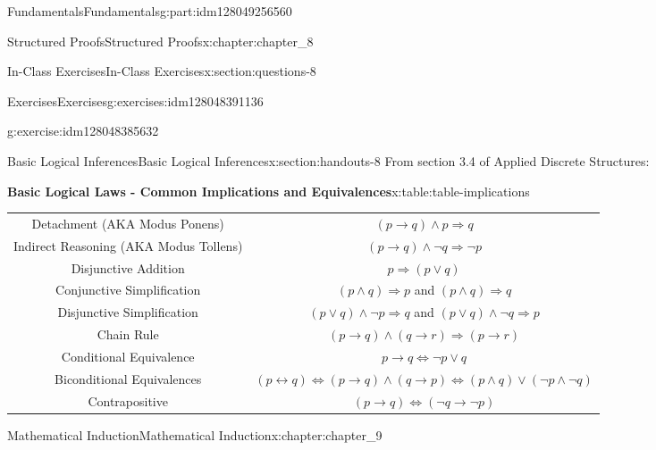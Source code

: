 \documentclass[oneside,10pt,]{book}
\newcommand{\tabularfont}{\relax}
\numberwithin{equation}{section}
\newcommand{\hrulemedium}{\noalign{\hrule height 0.07em}}
\begin{document}
\begin{partptx}{Fundamentals}{}{Fundamentals}{}{}{g:part:idm128049256560}
\begin{chapterptx}{Structured Proofs}{}{Structured Proofs}{}{}{x:chapter:chapter_8}
\begin{sectionptx}{In-Class Exercises}{}{In-Class Exercises}{}{}{x:section:questions-8}
\begin{exercises-subsection}{Exercises}{}{Exercises}{}{}{g:exercises:idm128048391136}
\begin{exercisegroup}
\begin{divisionexerciseeg}{3}{}{}{g:exercise:idm128048385632}
\end{divisionexerciseeg}%
\end{exercisegroup}
\par\medskip\noindent
\end{exercises-subsection}
\end{sectionptx}
%
%
\typeout{************************************************}
\typeout{************************************************}
%
\begin{sectionptx}{Basic Logical Inferences}{}{Basic Logical Inferences}{}{}{x:section:handouts-8}
From section 3.4 of Applied Discrete Structures:%
\begin{tableptx}{\textbf{Basic Logical Laws - Common Implications and Equivalences}}{x:table:table-implications}{}%
\centering
{}%
%
%
%
{\tabularfont%
\begin{tabular}{cc}
Detachment (AKA Modus Ponens)&\((p \rightarrow  q) \land  p\Rightarrow  q\)\tabularnewline\hrulemedium
Indirect Reasoning (AKA Modus Tollens)&\((p \to  q) \land  \neg q \Rightarrow  \neg p\)\tabularnewline\hrulemedium
Disjunctive Addition&\(p\Rightarrow (p\lor q)\)\tabularnewline\hrulemedium
Conjunctive Simplification&\((p \land  q) \Rightarrow  p\) and \((p \land  q) \Rightarrow  q\)\tabularnewline\hrulemedium
Disjunctive Simplification&\((p \lor  q) \land  \neg p \Rightarrow  q\) and \((p \lor q) \land \neg q\Rightarrow p\)\tabularnewline\hrulemedium
Chain Rule&\((p \to  q) \land  ( q \rightarrow  r) \Rightarrow  (p\to  r)\)\tabularnewline\hrulemedium
Conditional Equivalence&\(p \rightarrow  q \Leftrightarrow  \neg p \lor  q\)\tabularnewline\hrulemedium
Biconditional Equivalences&\((p \leftrightarrow  q) \Leftrightarrow  (p\rightarrow q) \land  (q \rightarrow  p)\Leftrightarrow (p \land  q) \lor  (\neg p \land  \neg q)\)\tabularnewline\hrulemedium
Contrapositive&\((p\to q) \Leftrightarrow (\neg q \to \neg p)\)
\end{tabular}
}%
\end{tableptx}%
\end{sectionptx}
\end{chapterptx}
%
\typeout{************************************************}
\typeout{************************************************}
%
\begin{chapterptx}{Mathematical Induction}{}{Mathematical Induction}{}{}{x:chapter:chapter_9}

\end{chapterptx}
\end{partptx}
\end{document}
